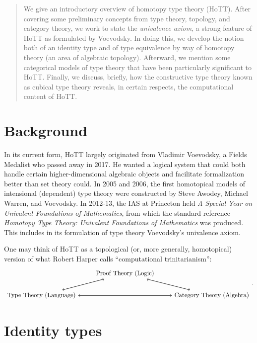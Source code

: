 \documentclass[10pt,letterpaper,cm]{nupset}
\theoremstyle{definition}
\theoremstyle{theorem}
\theoremstyle{remark}
\newcommand{\1}{\mathbf{1}}
\newcommand{\0}{\vec 0}
\begin{document}
\begin{abstract}
We give an introductory overview of homotopy type theory (HoTT). After covering some preliminary concepts from type theory, topology, and category theory, we work to state the \textit{univalence axiom}, a strong feature of HoTT as formulated by Voevodsky. In doing this, we develop the notion both of an identity type and of type equivalence by way of homotopy theory (an area of algebraic topology). Afterward, we mention some categorical models of type theory that have been particularly significant to HoTT. Finally, we discuss, briefly, how the constructive type theory known as cubical type theory reveals, in certain respects, the computational content of HoTT.
\end{abstract}



\tableofcontents
\newpage


\section*{Background}

In its current form, HoTT largely originated from Vladimir Voevodsky, a Fields Medalist who passed away in 2017. He wanted a logical system that could both handle certain higher-dimensional algebraic objects and facilitate formalization better than set theory could. In 2005 and 2006, the first homotopical models of intensional (dependent) type theory were constructed by Steve Awodey, Michael Warren, and Voevodsky. In 2012-13,  the IAS at Princeton held \textit{A Special Year on Univalent Foundations of Mathematics}, from which the standard reference \textit{Homotopy Type Theory: Univalent Foundations of Mathematics} was produced. This includes in its formulation of type theory Voevodsky's univalence axiom.

One may think of HoTT as a topological (or, more generally, homotopical) version of what Robert Harper calls ``computational trinitarianism'':
\[
\begin{tikzcd}
 & \text{Proof Theory (Logic)} \arrow[rd] \arrow[ld] &  \\
\text{Type Theory (Language)} \arrow[ru] \arrow[rr] &  & \text{Category Theory (Algebra)} \arrow[lu] \arrow[ll]
\end{tikzcd}
.\]

\section{Identity types}
\end{document}
